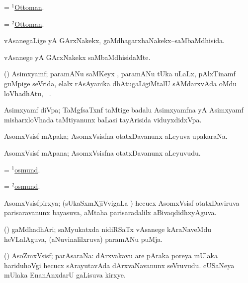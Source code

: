 \bentry
{}
\gl{\gu}
\bmng
= \hyperlink{Ottoman(1)}{$^1$Ottoman}. 
\emng
\eentry

\bentry
{}
\gl{\nA}
\bmng
= \hyperlink{Ottoman(2)}{$^2$Ottoman}. 
\emng
\eentry

\bentry
{}
\gl{\gu}
\bmng
vAsanegaLige yA GArxNakekx, gaMdhagarxhaNakekx--saMbaMdhisida. 
\emng
\eentry

\bentry
{}
\gl{\kirxvi}
\bmng
vAsanege yA GArxNakekx saMbaMdhisidaMte. 
\emng
\eentry

\bentry
{}
\gl{\nA}
\bmng
(\ravi) Asimxyamf; paramANu saMKeyx , paramANu tUka  uLaLx, pAlxTinamf guMpige seVrida, elalx rAsAyanika dhAtugaLigiMtalU sAMdarxvAda oMdu loVhadhAtu, \saMkeV\ . 
\emng
\eentry

\bentry
{}
\gl{\nA}
\bmng
Asimxyamf diVpa; TaMgfsaTxnf taMtige badalu Asimxyamfna yA Asimxyamf misharxloVhada taMtiyanunx baLasi tayArisida viduyxdidxVpa. 
\emng
\eentry

\bentry
{}
\gl{\nA}
\bmng
AsomxVsisf mApaka; AsomxVsisfna otatxDavanunx aLeyuva upakaraNa. 
\emng
\eentry

\bentry
{}
\gl{\nA}
\bmng
AsomxVsisf mApana; AsomxVsisfna otatxDavanunx aLeyuvudu. 
\emng
\eentry

\bentry
{}
\gl{\nA}
\bmng
= \hyperlink{osmund(1)}{$^1$osmund}. 
\emng
\eentry

\bentry
{}
\gl{\nA}
\bmng
= \hyperlink{osmund(2)}{$^2$osmund}. 
\emng
\eentry

\bentry
{}
\gl{\gu}
\bmng
AsomxVsisfpirxya; (sUkaSxmXjiVvigaLa \vi) hecucx AsomxVsisf otatxDaviruva parisaravanunx bayasuva, aMtaha parisaradalilx aBivaqdidhxyAguva. 
\emng
\eentry

\bentry
{}
\gl{\nA}
\bmng
(\ravi) gaMdhadhAri; saMyukatxda nidiRSaTx vAsanege kAraNaveMdu heVLalAguva, (aNuvinalilxruva) paramANu puMja. 
\emng
\eentry

\bentry
{}
\gl{\nA}
\bmng
(\jiVra) AsoZmxVsisf; parAsaraNa: 
\banum
{} dArxvakavu are pAraka poreya mUlaka hariduhoVgi hecucx sArayutavAda dArxvaNavanunx seVruvudu. 
 cUSaNeya mUlaka EnanAnxdarU gaLisuva kirxye. 
\eanum
\emng
\eentry

